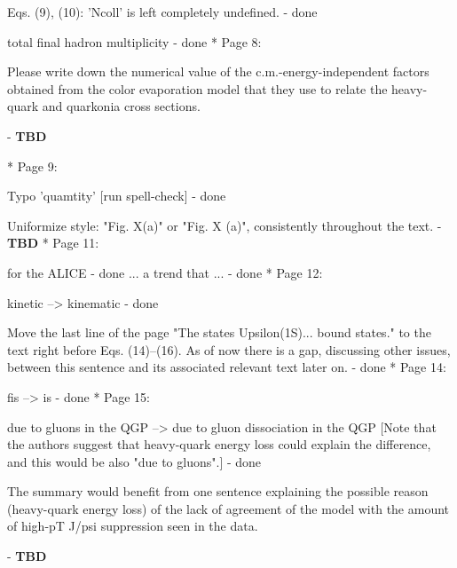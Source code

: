 \documentclass[a4paper,11pt]{article}
\begin{document}
Eqs. (9), (10): 'Ncoll' is left completely undefined.
- {\color{blue} done}\newline

total final hadron multiplicity 
- {\color{blue} done}\newline
* Page 8: 

Please write down the numerical value of the c.m.-energy-independent factors obtained 
from the color evaporation model that they use to relate the heavy-quark and quarkonia 
cross sections. 

- {\color{red} \textbf{TBD}}\newline

* Page 9: 

Typo 'quamtity' [run spell-check] 
- {\color{blue} done}\newline

Uniformize style: "Fig. X(a)" or "Fig. X (a)", consistently throughout the text. 
- {\color{red} \textbf{TBD}}\newline
* Page 11: 

for the ALICE 
- {\color{blue} done}\newline
... a trend that ... 
- {\color{blue} done}\newline
* Page 12: 

kinetic --> kinematic 
- {\color{blue} done}\newline

Move the last line of the page "The states Upsilon(1S)... bound states." to 
the text right before Eqs. (14)--(16). As of now there is a gap, discussing 
other issues, between this sentence and its associated relevant text later on. 
- {\color{blue} done}\newline
* Page 14: 

fis --> is 
- {\color{blue} done}\newline
* Page 15: 

due to gluons in the QGP --> due to gluon dissociation in the QGP 
[Note that the authors suggest that heavy-quark energy loss could explain 
the difference, and this would be also "due to gluons".]
- {\color{blue} done}\newline

The summary would benefit from one sentence explaining the possible reason 
(heavy-quark energy loss) of the lack of agreement of the model with 
the amount of high-pT J/psi suppression seen in the data. 

- {\color{red} \textbf{TBD}}\newline
\end{document}
